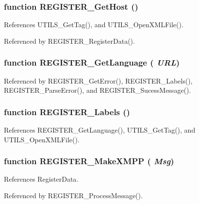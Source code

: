 \subsubsection{\setlength{\rightskip}{0pt plus 5cm}function REGISTER\_\-GetHost ()}\label{register_8js_60682a7fc707db31243bc09b0db76b40}




References UTILS\_\-GetTag(), and UTILS\_\-OpenXMLFile().

Referenced by REGISTER\_\-RegisterData().
\subsubsection{\setlength{\rightskip}{0pt plus 5cm}function REGISTER\_\-GetLanguage ( {\em URL})}\label{register_8js_ccbe8a48655edc3a8b9bfc6fd8e71c12}




Referenced by REGISTER\_\-GetError(), REGISTER\_\-Labels(), REGISTER\_\-ParseError(), and REGISTER\_\-SucessMessage().
\subsubsection{\setlength{\rightskip}{0pt plus 5cm}function REGISTER\_\-Labels ()}\label{register_8js_c489703e14685fd464a2d071d7938d8b}




References REGISTER\_\-GetLanguage(), UTILS\_\-GetTag(), and UTILS\_\-OpenXMLFile().
\subsubsection{\setlength{\rightskip}{0pt plus 5cm}function REGISTER\_\-MakeXMPP ( {\em Msg})}\label{register_8js_7b297505aaea7ef445a5979ad8445a6c}




References RegisterData.

Referenced by REGISTER\_\-ProcessMessage().
